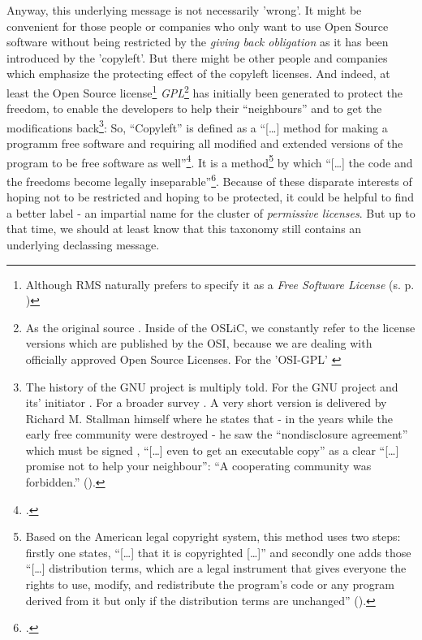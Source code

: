Anyway, this underlying message is not necessarily 'wrong'. It might be
convenient for those people or companies who only want to use Open Source
software without being restricted by the \emph{giving back obligation} as it has
been introduced by the 'copyleft'. But there might be other people and companies
which emphasize the protecting effect of the copyleft licenses. And indeed, at
least the Open Source license\footnote{Although RMS naturally prefers to specify
it as a \emph{Free Software License} (s. p. \pageref{RmsFsPriority}) }
\emph{GPL}\footnote{As the original source \cite[cf.][\nopage
wp]{Gpl20FsfLicense1991a}. Inside of the OSLiC, we constantly refer to the
license versions which are published by the OSI, because we are dealing with
officially approved Open Source Licenses. For the 'OSI-GPL' \cite[cf.][\nopage
wp]{Gpl20OsiLicense1991a}} has initially been generated to protect the freedom,
to enable the developers to help their \enquote{neighbours} and to get the
modifications back\footnote{The history of the GNU project is multiply told. For
the GNU project and its' initiator \cite[cf. pars pro toto][\nopage
passim]{Williams2002a}. For a broader survey \cite[cf. pars pro toto][\nopage
passim]{Moody2001a}. A very short version is delivered by Richard M.
Stallman himself where he states that - in the years while the early free
community were destroyed - he saw the \enquote{nondisclosure agreement} which
must be signed , \enquote{[\ldots] even to get an executable copy} as a clear
\enquote{[\ldots] promise not to help your neighbour}: \enquote{A cooperating
community was forbidden.} (\cite[cf.][16]{Stallman1999a}).}: So,
\enquote{Copyleft} is defined as a \enquote{[\ldots] method for making a
programm free software and requiring all modified and extended versions of the
program to be free software as well}\footcite[cf.][89]{Stallman1996c}. It is a
method\footnote{Based on the American legal copyright system, this method uses
two steps: firstly one states, \enquote{[\ldots] that it is copyrighted
[\ldots]} and secondly one adds those \enquote{[\ldots] distribution terms,
which are a legal instrument that gives everyone the rights to use, modify, and
redistribute the program's code or any program derived from it but only if the
distribution terms are unchanged} (\cite[cf.][89]{Stallman1996c}).} by which
\enquote{[\ldots] the code and the freedoms become legally
inseparable}\footcite[cf.][89]{Stallman1996c}. Because of these disparate
interests of hoping not to be restricted and hoping to be protected, it could be
helpful to find a better label - an impartial name for the cluster of
\emph{permissive licenses}. But up to that time, we should at least know that
this taxonomy still contains an underlying declassing message.

